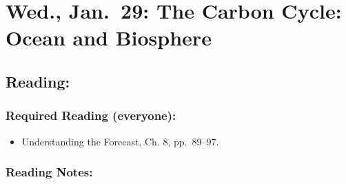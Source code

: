 \documentclass[
]{article}
\providecommand{\tightlist}{%
  \setlength{\itemsep}{0pt}\setlength{\parskip}{0pt}}
\begin{document}
\hypertarget{wed.-jan.-29-the-carbon-cycle-ocean-and-biosphere}{%
\section{Wed., Jan.~29: The Carbon Cycle: Ocean and
Biosphere}\label{wed.-jan.-29-the-carbon-cycle-ocean-and-biosphere}}

\hypertarget{reading-9}{%
\subsection{Reading:}\label{reading-9}}

\hypertarget{required-reading-everyone-7}{%
\subsubsection{Required Reading
(everyone):}\label{required-reading-everyone-7}}

\begin{itemize}
\tightlist
\item
  Understanding the Forecast, Ch. 8, pp.~89--97.
\end{itemize}

\hypertarget{reading-notes-7}{%
\subsubsection{Reading Notes:}\label{reading-notes-7}}
\end{document}
